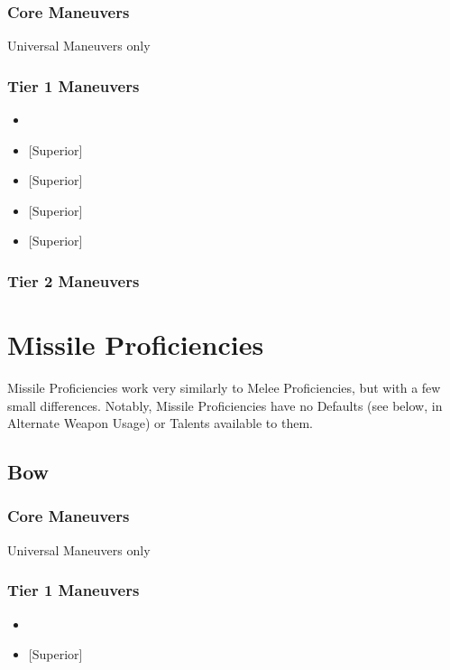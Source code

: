 \documentclass[oneside,11pt,english]{book}
\begin{document}
\subsubsection{Core Maneuvers}
Universal Maneuvers only

\subsubsection{Tier 1 Maneuvers}
\vspace{-5pt}\begin{itemize}
  [itemsep=0.5mm]
\item {}
\item {} [Superior] 
\item {} [Superior] 
\item {} [Superior] 
\item {} [Superior] 
\end{itemize}
\subsubsection{Tier 2 Maneuvers}

\section{Missile Proficiencies}
Missile Proficiencies work very similarly to Melee Proficiencies, but with a few small differences. 
Notably, Missile Proficiencies have no Defaults (see below, in Alternate Weapon Usage) or Talents 
available to them. 

\subsection{Bow}
\subsubsection{Core Maneuvers}
Universal Maneuvers only 

\subsubsection{Tier 1 Maneuvers}
\vspace{-5pt}\begin{itemize}
  [itemsep=0.5mm]
\item {}
\item {} [Superior]
\end{itemize}
\end{document}
